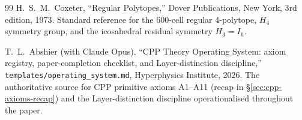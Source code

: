 \documentclass[11pt,letterpaper]{article}
\begin{document}
\begin{thebibliography}{99}
H.~S.~M.~Coxeter,
``Regular Polytopes,''
Dover Publications, New York, 3rd edition, 1973.
Standard reference for the 600-cell regular 4-polytope, $H_4$ symmetry group, and the icosahedral residual symmetry $H_3 = I_h$.

T.~L.~Abshier (with Claude Opus),
``CPP Theory Operating System: axiom registry, paper-completion checklist, and Layer-distinction discipline,''
\texttt{templates/operating\_system.md}, Hyperphysics Institute, 2026.
The authoritative source for CPP primitive axioms A1--A11 (recap in \S\ref{sec:cpp-axioms-recap}) and the Layer-distinction discipline operationalised throughout the paper.

\end{thebibliography}
\end{document}
